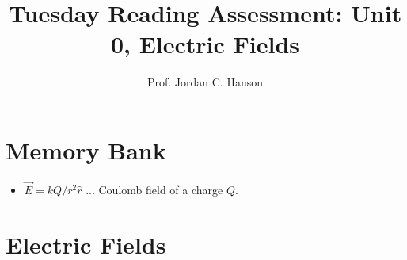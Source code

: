 \documentclass{article}
\begin{document}
\title{Tuesday Reading Assessment: Unit 0, Electric Fields}
\author{Prof. Jordan C. Hanson}

\maketitle

\section{Memory Bank}

\begin{itemize}
\item $\vec{E} = k Q / r^2 \hat{r}$ ... Coulomb field of a charge $Q$.
\end{itemize}

\section{Electric Fields}
\end{document}
